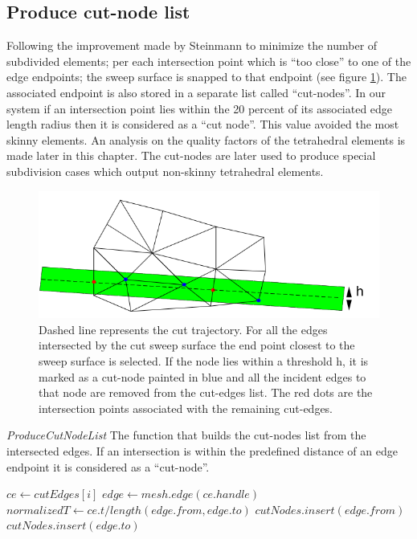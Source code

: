 \subsection{Produce cut-node list}
Following the improvement made by Steinmann \etal \cite{Steinemann} to minimize the number of subdivided elements; 
per each intersection point which is ``too close'' to one of the edge endpoints; 
the sweep surface is snapped to that endpoint (see figure \ref{fig:cutnode}). The associated endpoint is also stored in a separate list called ``cut-nodes''. 
In our system if an intersection point lies within the 20 percent of its associated edge length radius then it is considered 
as a ``cut node''. This value avoided the most skinny elements. An analysis on the quality factors of the tetrahedral elements 
is made later in this chapter. The cut-nodes are later used to produce special subdivision cases which output non-skinny 
tetrahedral elements.

\begin{figure}[H]
  \centering
  \includegraphics[width=0.8\linewidth]{figures/cutting/cutnode.png}
  \caption{\label{fig:cutnode}
  {Dashed line represents the cut trajectory. For all the edges intersected by the cut sweep surface the end point closest to the sweep surface is selected.
  If the node lies within a threshold h, it is marked as a cut-node painted in blue and all the incident edges to that node are removed from the cut-edges list.
  The red dots are the intersection points associated with the remaining cut-edges.}
}
\end{figure}

\begin{algorithm}[H]
\caption{\textit{ProduceCutNodeList} The function that builds the cut-nodes list from the intersected edges.
If an intersection is within the predefined distance of an edge endpoint it is considered as a ``cut-node''.}
\label{alg:produceCutNodes}
\begin{algorithmic}[1]	
  \STATE $ce \gets cutEdges\left[i\right]$
  \STATE $edge \gets mesh.edge(ce.handle)$
  \STATE $normalizedT \gets ce.t / length(edge.from, edge.to)$
  \STATE $cutNodes.insert(edge.from)$
  \ELSE
    \STATE $cutNodes.insert(edge.to)$
    \ENDIF
  \ENDIF
  \ENDFOR
\end{algorithmic}
\end{algorithm}

